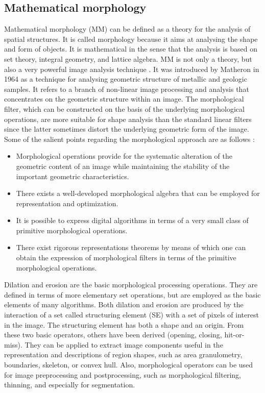 \documentclass[sensors,review,submit,moreauthors,pdftex,10pt,a4paper]{mdpi}
\begin{document}
\subsection{Mathematical morphology}
Mathematical morphology (MM) can be defined as a theory for the analysis of spatial structures. It is called morphology because it aims at analysing the shape and form of objects. It is mathematical in the sense that the analysis is based on set theory, integral geometry, and lattice algebra. MM is not only a theory, but also a very powerful image analysis technique \cite{Soille2004}.
It was introduced by Matheron in 1964 as a technique for analysing geometric structure of metallic and geologic samples. It refers to a branch of non-linear image processing and analysis that concentrates on the geometric structure within an image.
The morphological filter, which can be constructed on the basis of the underlying morphological operations, are more suitable for shape analysis than the standard linear filters since the latter sometimes distort the underlying geometric form of the image. Some of the salient points regarding the morphological approach are as follows \cite{Giardina1988}:
\begin{itemize}[leftmargin=*,labelsep=5.8mm]
	\item Morphological operations provide for the systematic alteration of the geometric content of an image while maintaining the stability of the important geometric characteristics.
	\item There exists a well-developed morphological algebra that can be employed for representation and optimization.
	\item It is possible to express digital algorithms in terms of a very small class of primitive morphological operations.
	\item There exist rigorous representations theorems by means of which one can obtain the expression of morphological filters in terms of the primitive morphological operations.
\end{itemize}
Dilation and erosion are the basic morphological processing operations. They are defined in terms of more elementary set operations, but are employed as the basic elements of many algorithms. Both dilation and erosion are produced by the interaction of a set called structuring element (SE) with a set of pixels of interest in the image. The structuring element has both a shape and an origin. From these two basic operators, others have been derived (opening, closing, hit-or-miss). They can be applied to extract image components useful in the representation and descriptions of region shapes, such as area granulometry, boundaries, skeleton, or convex hull. Also, morphological operators can be used for image preprocessing and postprocessing, such as morphological filtering, thinning, and especially for segmentation.
\end{document}
